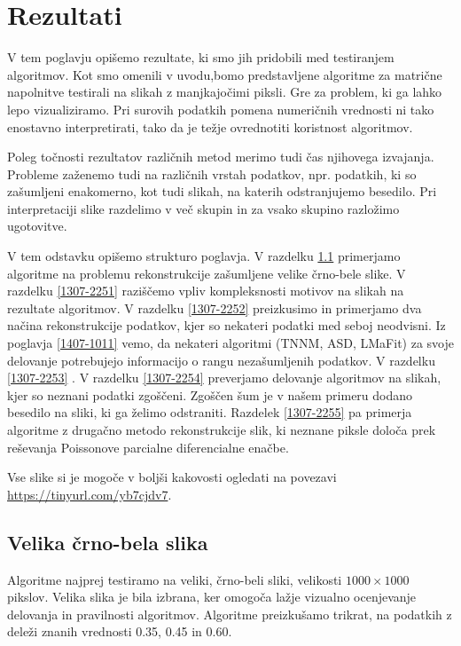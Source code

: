 \chapter{Rezultati}\label{1407-1012}

V tem poglavju opišemo rezultate, ki smo jih pridobili med testiranjem algoritmov. Kot smo omenili v uvodu,bomo predstavljene algoritme za matrične napolnitve testirali na slikah z manjkajočimi piksli.
Gre za problem, ki ga lahko lepo vizualiziramo.
Pri surovih podatkih pomena numeričnih vrednosti ni tako enostavno interpretirati, tako da je težje ovrednotiti koristnost algoritmov.

Poleg točnosti rezultatov različnih metod merimo tudi čas njihovega izvajanja. Probleme zaženemo tudi na različnih vrstah podatkov, npr. podatkih, ki so zašumljeni enakomerno, kot tudi slikah, na katerih odstranjujemo besedilo.
Pri interpretaciji slike razdelimo v več skupin in za vsako skupino razložimo ugotovitve.

V tem odstavku opišemo strukturo poglavja.
V razdelku \ref{1307-2250} primerjamo algoritme na problemu rekonstrukcije zašumljene velike črno-bele slike. V razdelku \ref{1307-2251} raziščemo vpliv kompleksnosti motivov na slikah na rezultate algoritmov. V razdelku \ref{1307-2252} preizkusimo in primerjamo dva načina rekonstrukcije podatkov, kjer so nekateri podatki med seboj neodvisni. Iz poglavja \ref{1407-1011} vemo, da nekateri algoritmi (TNNM, ASD, LMaFit) za svoje delovanje potrebujejo informacijo o rangu nezašumljenih podatkov. V razdelku \ref{1307-2253} . V razdelku \ref{1307-2254} preverjamo delovanje algoritmov na slikah, kjer so neznani podatki zgoščeni.
Zgoščen šum je v našem primeru dodano besedilo na sliki, ki ga želimo odstraniti. Razdelek \ref{1307-2255} pa primerja algoritme z drugačno metodo rekonstrukcije slik, ki neznane piksle določa prek reševanja Poissonove parcialne diferencialne enačbe.


Vse slike si je mogoče v boljši kakovosti ogledati na povezavi \url{https://tinyurl.com/yb7cjdv7}.

\section{Velika črno-bela slika} \label{1307-2250}
Algoritme najprej testiramo na veliki, črno-beli sliki, velikosti $1000\times1000$ pikslov. Velika slika je bila izbrana, ker omogoča lažje vizualno ocenjevanje delovanja in pravilnosti algoritmov.
 Algoritme preizkušamo trikrat, na podatkih z deleži znanih vrednosti 0.35, 0.45  in 0.60.

\FloatBarrier

